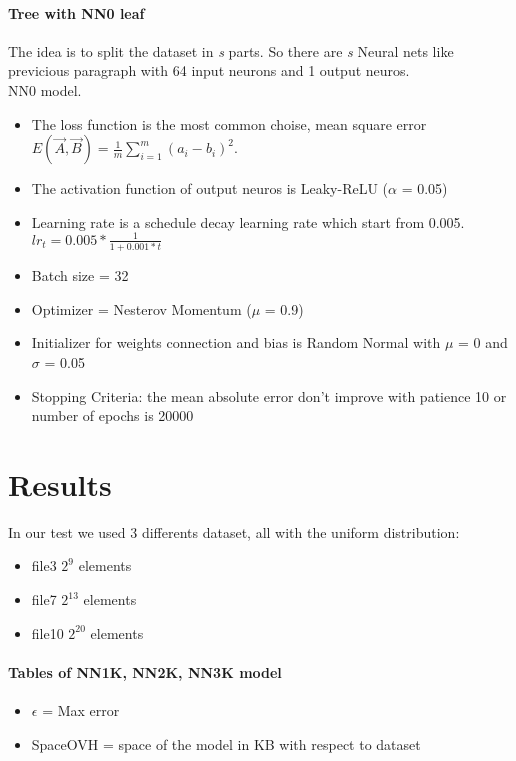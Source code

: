 \documentclass[]{article}
\begin{document}
	\paragraph{Tree with NN0 leaf}
	The idea is to split the dataset in \textit{s} parts. So there are \textit{s} Neural nets like previcious paragraph with 64 input neurons and 1 output neuros.\\ NN0 model.
	\begin{itemize}
		\item The loss function is the most common choise, mean square error $E(\vec{A}, \vec{B}) = \frac{1}{m} \sum_{i=1}^{m}(a_{i} - b_{i})^{2} $.
		\item The activation function of output neuros is Leaky-ReLU ($\alpha$ = 0.05)
		\item Learning rate is a schedule decay learning rate which start from 0.005. $lr_{t} = 0.005 * \frac{1}{1+0.001*t}$
		\item Batch size = 32
		\item Optimizer = Nesterov Momentum ($\mu$ = 0.9)
		\item Initializer for weights connection and bias is Random Normal with $\mu$ = 0 and $\sigma$ = 0.05
		\item Stopping Criteria: the mean absolute error don't improve with patience 10 or number of epochs is 20000
		
	\end{itemize}
	 


	

\section{Results}
	In our test we used 3 differents dataset, all with the uniform distribution: 
	\begin{itemize}
		\item file3 $2^{9}$ elements
		\item file7 $2^{13}$ elements
		\item file10 $2^{20}$ elements
	\end{itemize}

	\paragraph{Tables of NN1K, NN2K, NN3K model}
		\begin{itemize}
			\item $\epsilon$ = Max error
			\item SpaceOVH = space of the model in KB with respect to dataset
		\end{itemize}
	
\end{document}
